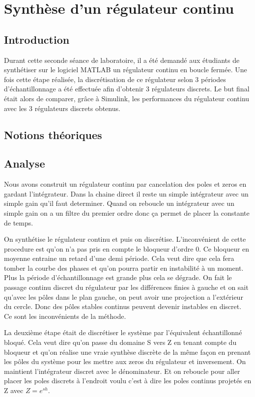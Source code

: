 \chapter{Synthèse d'un régulateur continu}

\section{Introduction}
Durant cette seconde séance de laboratoire, il a été demandé aux étudiants de synthétiser sur le logiciel MATLAB un régulateur continu en boucle fermée.
Une fois cette étape réalisée, la discrétisation de ce régulateur selon 3 périodes d'échantillonnage a été effectuée afin d'obtenir 3 régulateurs discrets.
Le but final était alors de comparer, grâce à Simulink, les performances du régulateur continu avec les 3 régulateurs discrets obtenus. 

\section{Notions théoriques}


\section{Analyse}
Nous avons construit un régulateur continu par cancelation des poles et zeros en gardant l'intégrateur.
Dans la chaine direct il reste un simple intégrateur avec un simple gain qu'il faut determiner.
Quand on reboucle un intégrateur avec un simple gain on a un filtre du premier ordre donc ça permet de placer la constante de temps.

On synthétise le régulateur continu et puis on discrétise.
L'inconvénient de cette procedure est qu'on n'a pas pris en compte le bloqueur d'ordre 0.
Ce bloqueur en moyenne entraine un retard d'une demi période.
Cela veut dire que cela fera tomber la courbe des phases et qu'on pourra partir en instabilité à un moment.
Plus la période d'échantillonnage est grande plus cela se dégrade.
On fait le passage continu discret du régulateur par les différences finies à gauche et on sait qu'avec les pôles dans le plan gauche, on peut avoir une projection a l'extérieur du cercle.
Donc des pôles stables continus peuvent devenir instables en discret. Ce sont les inconvénients de la méthode.

La deuxième étape était de discrétiser le système par l'équivalent échantillonné bloqué.
Cela veut dire qu'on passe du domaine S vers Z en tenant compte du bloqueur et qu'on réalise une vraie synthèse discrète de la même façon en prenant les pôles du système pour les mettre aux zeros du régulateur et inversement.
On maintient l'intégrateur discret avec le dénominateur. 
Et on reboucle pour aller placer les poles discrets à l'endroit voulu c'est à dire les poles continus projetés en Z avec $Z=e^{sh}$.

